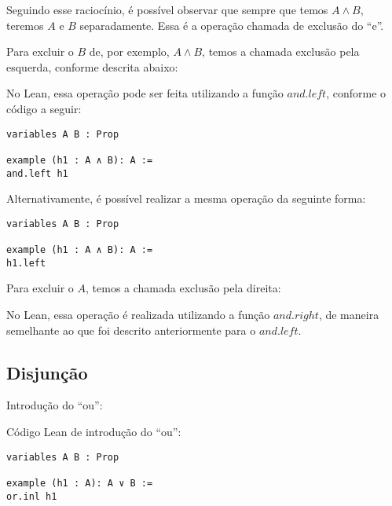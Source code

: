 Seguindo esse raciocínio, é possível observar que sempre que temos $A \land B$, teremos $A$ e $B$ separadamente. Essa é a operação chamada de exclusão do ``e''.

Para excluir o $B$ de, por exemplo, $A \land B$, temos a chamada exclusão pela esquerda, conforme descrita abaixo:

 \begin{prooftree}
\end{prooftree}

No Lean, essa operação pode ser feita utilizando a função $and.left$, conforme o código a seguir: 
\vspace{5mm}
\begin{lstlisting} 
variables A B : Prop

example (h1 : A ∧ B): A :=
and.left h1
\end{lstlisting}
\vspace{5mm}

Alternativamente, é possível realizar a mesma operação da seguinte forma:
\vspace{5mm}
\begin{lstlisting} 
variables A B : Prop

example (h1 : A ∧ B): A :=
h1.left
\end{lstlisting}
\vspace{5mm}
Para excluir o $A$, temos a chamada exclusão pela direita:

 \begin{prooftree}
\end{prooftree}

No Lean, essa operação é realizada utilizando a função $and.right$, de maneira semelhante ao que foi descrito anteriormente para o $and.left$. 

\subsection{Disjunção}

Introdução do ``ou'':
\begin{prooftree}
\end{prooftree}

Código Lean de introdução do ``ou'':
\begin{lstlisting} 
variables A B : Prop

example (h1 : A): A ∨ B :=
or.inl h1
\end{lstlisting} 

